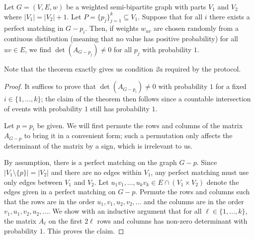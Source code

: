 \begin{theorem}
\label{thm:random_weights}
Let $G = (V,E,w)$ be a weighted semi-bipartite graph with parts $V_1$ and $V_2$ where $|V_1| = |V_2| + 1$. Let $P = \{p_j\}_{j=1}^k \subseteq V_1$. Suppose that for all $i$ there exists a perfect matching in $G-p_i$. Then, if weights $w_{uv}$ are chosen randomly from a contiuous distibution (meaning that no value has positive probability) for all $uv\in E$, we find $\det(A_{G-p_j}) \neq 0$ for all $p_j$ with probability $1$.
\end{theorem}
Note that the theorem exactly gives us condition \emph{2a} required by the protocol. 


\begin{proof}%
It suffices to prove that $\det(A_{G-p_i})\neq 0$ with probability $1$ for a fixed $i\in \{1,\dots,k\}$; the claim of the theorem then follows since a countable intersection of events with probability $1$ still has probability $1$.

Let $p=p_i$ be given. We will first permute the rows and columns of the matrix $A_{G-p}$ to bring it in a convenient form; such a permutation only affects the determinant of the matrix by a sign, which is irrelevant to us. 

By assumption, there is a perfect matching on the graph $G-p$. Since $|V_1 \setminus \{ p \} |=|V_2|$ and there are no edges within $V_1$, any perfect matching must use only edges between $V_1$ and $V_2$. Let $u_1v_1,\dots,u_kv_k\in E\cap (V_1\times V_2)$ denote the edges given in a perfect matching on $G-p$. Permute the rows and columns such that the rows are in the order $u_1,v_1,u_2,v_2,\dots$ and the columns are in the order $v_1,u_1,v_2,u_2,\dots$.
We show with an inductive argument that for all $\ell\in \{1,\dots,k\}$, the matrix $A_\ell$ on the first $2\ell$ rows and columns has non-zero determinant with probability $1$. This proves the claim.


\end{proof}
